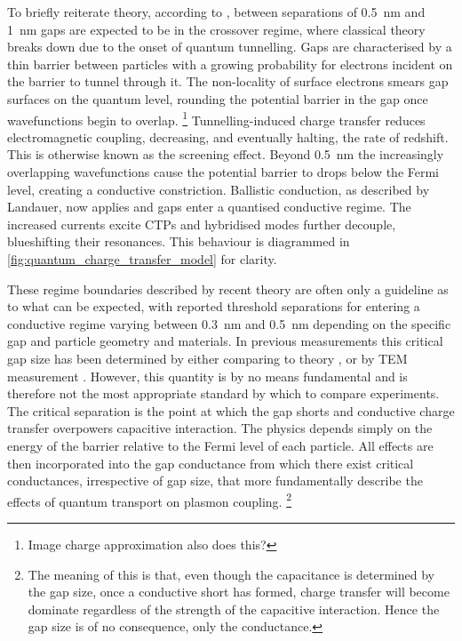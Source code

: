 \documentclass[a4paper]{article}
\begin{document}
To briefly reiterate theory, according to \cite{zuloaga2009}, between separations of \SI{0.5}{nm} and \SI{1}{nm} gaps are expected to be in the crossover regime, where classical theory breaks down due to the onset of quantum tunnelling. Gaps are characterised by a thin barrier between particles with a growing probability for electrons incident on the barrier to tunnel through it. The non-locality of surface electrons smears gap surfaces on the quantum level, rounding the potential barrier in the gap once wavefunctions begin to overlap.%
\footnote{\color{red}Image charge approximation also does this?}
Tunnelling-induced charge transfer reduces electromagnetic coupling, decreasing, and eventually halting, the rate of redshift. This is otherwise known as the screening effect. Beyond \SI{0.5}{nm} the increasingly overlapping wavefunctions cause the potential barrier to drops below the Fermi level, creating a conductive constriction. Ballistic conduction, as described by Landauer, now applies and gaps enter a quantised conductive regime. The increased currents excite CTPs and hybridised modes further decouple, blueshifting their resonances. This behaviour is diagrammed in \autoref{fig:quantum_charge_transfer_model} for clarity.

These regime boundaries described by recent theory are often only a guideline as to what can be expected, with reported threshold separations for entering a conductive regime varying between \SI{0.3}{nm} \cite{savage2012} and \SI{0.5}{nm} \cite{scholl2013} depending on the specific gap and particle geometry and materials. In previous measurements this critical gap size has been determined by either comparing to theory \cite{savage2012}, or by TEM measurement \cite{scholl2013}. However, this quantity is by no means fundamental and is therefore not the most appropriate standard by which to compare experiments. The critical separation is the point at which the gap shorts and conductive charge transfer overpowers capacitive interaction. The physics depends simply on the energy of the barrier relative to the Fermi level of each particle. All effects are then incorporated into the gap conductance from which there exist critical conductances, irrespective of gap size, that more fundamentally describe the effects of quantum transport on plasmon coupling.%
\footnote{The meaning of this is that, even though the capacitance is determined by the gap size, once a conductive short has formed, charge transfer will become dominate regardless of the strength of the capacitive interaction. Hence the gap size is of no consequence, only the conductance.}
\end{document}
